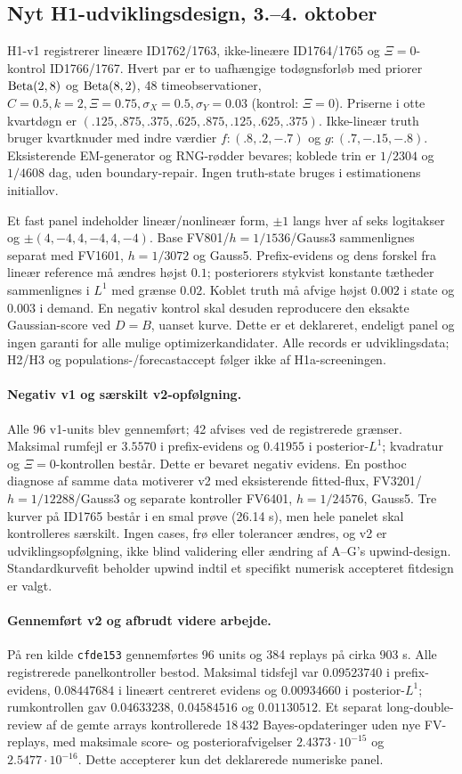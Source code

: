 \subsection{Nyt H1-udviklingsdesign, 3.--4. oktober}
H1-v1 registrerer lineære ID1762/1763, ikke-lineære ID1764/1765 og
$\Xi=0$-kontrol ID1766/1767. Hvert par er to uafhængige todøgnsforløb
med priorer $\operatorname{Beta}(2,8)$ og $\operatorname{Beta}(8,2)$, 48 timeobservationer,
$C=0.5,k=2,\Xi=0.75,\sigma_X=0.5,\sigma_Y=0.03$ (kontrol: $\Xi=0$).
Priserne i otte kvartdøgn er $(.125,.875,.375,.625,.875,.125,.625,.375)$.
Ikke-lineær truth bruger kvartknuder med indre værdier
$f:(.8,.2,-.7)$ og $g:(.7,-.15,-.8)$. Eksisterende EM-generator og RNG-rødder
bevares; koblede trin er $1/2304$ og $1/4608$ dag, uden boundary-repair.
Ingen truth-state bruges i estimationens initiallov.

Et fast panel indeholder lineær/nonlineær form, $\pm1$ langs hver af seks
logitakser og $\pm(4,-4,4,-4,4,-4)$. Base FV801/$h=1/1536$/Gauss3
sammenlignes separat med FV1601, $h=1/3072$ og Gauss5.
Prefix-evidens og dens forskel fra lineær reference må ændres højst $0.1$;
posteriorers stykvist konstante tætheder sammenlignes i $L^1$ med grænse $0.02$.
Koblet truth må afvige højst $0.002$ i state og $0.003$ i demand.
En negativ kontrol skal desuden reproducere den eksakte Gaussian-score ved
$D=B$, uanset kurve. Dette er et deklareret, endeligt panel og ingen garanti
for alle mulige optimizerkandidater. Alle records er udviklingsdata; H2/H3
og populations-/forecastaccept følger ikke af H1a-screeningen.

\paragraph{Negativ v1 og særskilt v2-opfølgning.}
Alle 96 v1-units blev gennemført; 42 afvises ved de registrerede grænser.
Maksimal rumfejl er $3.5570$ i prefix-evidens og $0.41955$ i posterior-$L^1$;
kvadratur og $\Xi=0$-kontrollen består. Dette er bevaret negativ evidens.
En posthoc diagnose af samme data motiverer v2 med eksisterende fitted-flux,
FV3201/$h=1/12288$/Gauss3 og separate kontroller FV6401,
$h=1/24576$, Gauss5. Tre kurver på ID1765 består i en smal prøve (26.14 s),
men hele panelet skal kontrolleres særskilt. Ingen cases, frø eller tolerancer
ændres, og v2 er udviklingsopfølgning, ikke blind validering eller ændring af
A--G's upwind-design. Standardkurvefit beholder upwind indtil et specifikt
numerisk accepteret fitdesign er valgt.

\paragraph{Gennemført v2 og afbrudt videre arbejde.}
På ren kilde \texttt{cfde153} gennemførtes 96 units og 384 replays på
cirka 903 s. Alle registrerede panelkontroller bestod.
Maksimal tidsfejl var $0.09523740$ i prefix-evidens,
$0.08447684$ i lineært centreret evidens og $0.00934660$ i posterior-$L^1$;
rumkontrollen gav $0.04633238$, $0.04584516$ og $0.01130512$.
Et separat long-double-review af de gemte arrays kontrollerede 18\,432
Bayes-opdateringer uden nye FV-replays, med maksimale score- og
posteriorafvigelser $2.4373\cdot10^{-15}$ og $2.5477\cdot10^{-16}$.
Dette accepterer kun det deklarerede numeriske panel.

